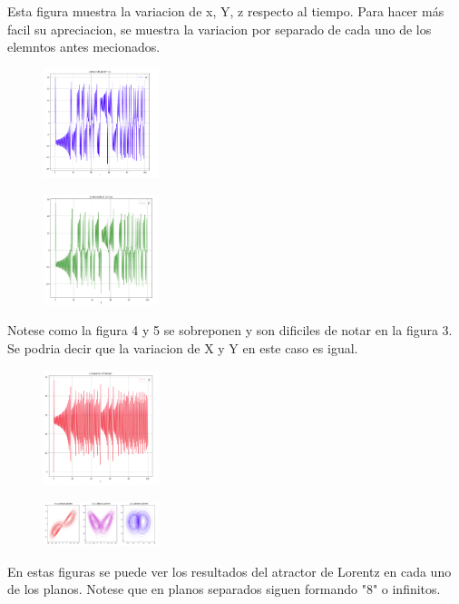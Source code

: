 \documentclass[a4paper]{article}
\begin{document}
Esta figura muestra la variacion de x, Y, z respecto al tiempo. Para hacer más facil su apreciacion, se muestra la variacion por separado de cada uno de los elemntos antes mecionados. 

\begin{figure}[ht!]
\centering
\includegraphics[width=0.3\textwidth]{C1.png}
\caption{\label{fig:}}
\end{figure}

\begin{figure}[ht!]
\centering
\includegraphics[width=0.3\textwidth]{D1.png}
\caption{\label{fig:}}
\end{figure}

Notese como la figura 4 y 5 se sobreponen y son dificiles de notar en la figura 3. Se podria decir que la variacion de X y Y en este caso es igual.
\newpage

\begin{figure}[ht!]
\centering
\includegraphics[width=0.3\textwidth]{E1.png}
\caption{\label{fig:}}
\end{figure}

\begin{figure}[ht!]
\centering
\includegraphics[width=0.3\textwidth]{F1.png}
\caption{\label{fig:}}
\end{figure}
 En estas figuras se puede ver los resultados del atractor de Lorentz en cada uno de los planos. Notese que en planos separados siguen formando "8" o infinitos. 
\end{document}
